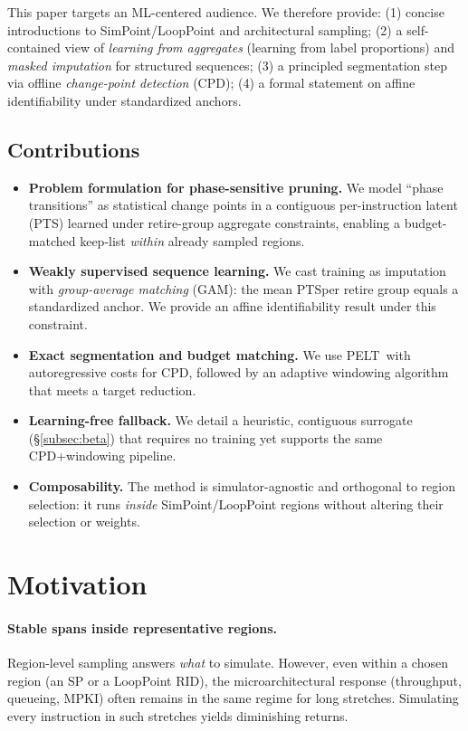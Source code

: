 \documentclass[10pt,journal,compsoc]{IEEEtran}
\newcommand{\pts}{\textsc{PTS}}
\newcommand{\gam}{\textsc{GAM}}
\newcommand{\cpd}{\textsc{CPD}}
\newcommand{\pelt}{\textsc{PELT}}
\begin{document}
This paper targets an ML-centered audience. We therefore provide:
(1) concise introductions to SimPoint/LoopPoint and architectural sampling;
(2) a self-contained view of \emph{learning from aggregates} (learning from label proportions) and \emph{masked imputation} for structured sequences;
(3) a principled segmentation step via offline \emph{change-point detection} (\cpd);
(4) a formal statement on affine identifiability under standardized anchors.
\subsection*{Contributions}
\begin{itemize}[leftmargin=*,noitemsep,topsep=0pt]
  \item \textbf{Problem formulation for phase-sensitive pruning.} We model “phase transitions” as statistical change points in a contiguous per-instruction latent (\pts) learned under retire-group aggregate constraints, enabling a budget-matched keep-list \emph{within} already sampled regions.
  \item \textbf{Weakly supervised sequence learning.} We cast training as imputation with \emph{group-average matching} (\gam): the mean \pts per retire group equals a standardized anchor. We provide an affine identifiability result under this constraint.
  \item \textbf{Exact segmentation and budget matching.} We use \pelt\ with autoregressive costs for \cpd, followed by an adaptive windowing algorithm that meets a target reduction.
  \item \textbf{Learning-free fallback.} We detail a heuristic, contiguous surrogate (\S\ref{subsec:beta}) that requires no training yet supports the same \cpd+windowing pipeline.
  \item \textbf{Composability.} The method is simulator-agnostic and orthogonal to region selection: it runs \emph{inside} SimPoint/LoopPoint regions without altering their selection or weights.
\end{itemize}
\section{Motivation}
\label{sec:motivation}
\paragraph{Stable spans inside representative regions.}
Region-level sampling answers \emph{what} to simulate. However, even within a chosen region (an SP or a LoopPoint RID), the microarchitectural response (throughput, queueing, MPKI) often remains in the same regime for long stretches. Simulating every instruction in such stretches yields diminishing returns.
\end{document}
